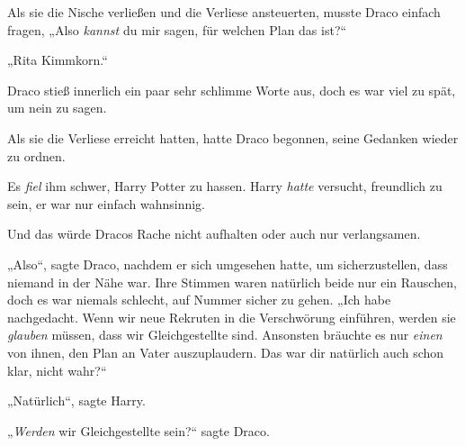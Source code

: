 Als sie die Nische verließen und die Verliese ansteuerten, musste Draco einfach fragen,
„Also \emph{kannst} du mir sagen, für welchen Plan das ist?“

„Rita Kimmkorn.“

Draco stieß innerlich ein paar sehr schlimme Worte aus, doch es war viel zu spät, um nein zu sagen.

\later

Als sie die Verliese erreicht hatten, hatte Draco begonnen, seine Gedanken wieder zu ordnen.

Es \emph{fiel} ihm schwer, Harry Potter zu hassen. Harry \emph{hatte} versucht, freundlich zu sein, er war nur einfach wahnsinnig.

Und das würde Dracos Rache nicht aufhalten oder auch nur verlangsamen.

„Also“, sagte Draco, nachdem er sich umgesehen hatte, um sicherzustellen, dass niemand in der Nähe war. Ihre Stimmen waren natürlich beide nur ein Rauschen, doch es war niemals schlecht, auf Nummer sicher zu gehen.
„Ich habe nachgedacht. Wenn wir neue Rekruten in die Verschwörung einführen, werden sie \emph{glauben} müssen, dass wir Gleichgestellte sind. Ansonsten bräuchte es nur \emph{einen} von ihnen, den Plan an Vater auszuplaudern. Das war dir natürlich auch schon klar, nicht wahr?“

„Natürlich“, sagte Harry.

„\emph{Werden} wir Gleichgestellte sein?“ sagte Draco.


